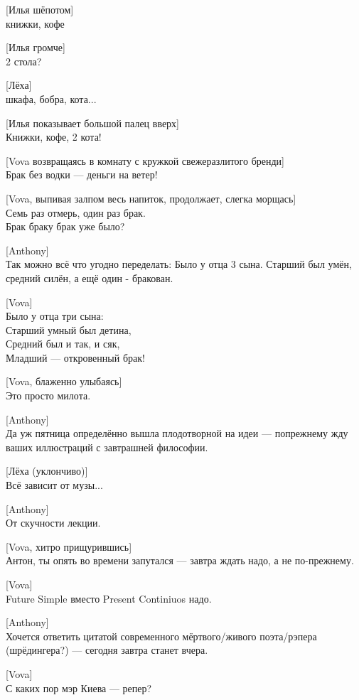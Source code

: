 [Илья шёпотом]\\
книжки, кофе


[Илья громче]\\
2 стола?


[Лёха]\\
шкафа, бобра, кота...


[Илья показывает большой палец вверх]\\
Книжки, кофе, 2 кота!


[Vova возвращаясь в комнату с кружкой свежеразлитого бренди]\\
Брак без водки — деньги на ветер!


[Vova, выпивая залпом весь напиток, продолжает, слегка морщась]\\
Семь раз отмерь, один раз брак.\\
Брак браку брак уже было?


[Anthony]\\
Так можно всё что угодно переделать: Было у отца 3 сына. Старший был умён, средний силён, а ещё один - бракован.


[Vova]\\
Было у отца три сына:\\
Старший умный был детина,\\
Средний был и так, и сяк,\\
Младший — откровенный брак!


[Vova, блаженно улыбаясь]\\
Это просто милота.


[Anthony]\\
Да уж пятница определённо вышла плодотворной на идеи --- попрежнему жду ваших иллюстраций с завтрашней философии.


[Лёха (уклончиво)]\\
Всё зависит от музы...


[Anthony]\\
От скучности лекции.


[Vova, хитро прищурившись]\\
Антон, ты опять во времени запутался — завтра ждать надо, а не по-прежнему.


[Vova]\\
Future Simple вместо Present Continiuos надо.


[Anthony]\\
Хочется ответить цитатой современного мёртвого/живого поэта/рэпера (шрёдингера?) --- сегодня завтра станет вчера.


[Vova]\\
С каких пор мэр Киева — репер?


